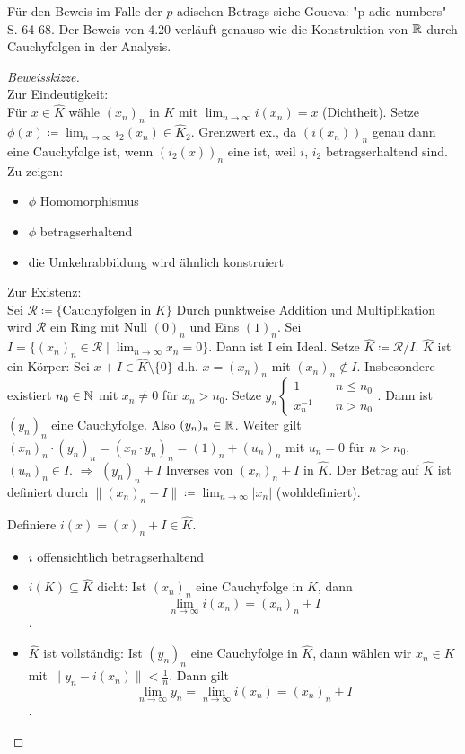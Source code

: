 \documentclass[../main.tex]{subfiles}
\begin{document}
Für den Beweis im Falle der $p$-adischen Betrags siehe Goueva: "p-adic numbers" S. 64-68.
Der Beweis von 4.20 verläuft genauso wie die Konstruktion von $\mathbb{R}$ durch Cauchyfolgen in der Analysis.
\begin{proof}[Beweisskizze]$ $\\
    Zur Eindeutigkeit:\\
    Für $x\in \hat{K}$ wähle $(x_n)_n$ in $K$ mit $\lim_{n\rightarrow \infty} i(x_n) = x$ (Dichtheit).
    Setze $\phi(x)\coloneqq \lim_{n\rightarrow\infty} i_2(x_n)\in \hat{K}_2$.
    Grenzwert ex., da $(i(x_n))_n$ genau dann eine Cauchyfolge ist, wenn $\left(i_2(x)\right)_n$ eine ist, weil $i$, $i_2$ betragserhaltend sind.
    Zu zeigen:
    \begin{itemize}[noitemsep]
        \item $\phi$ Homomorphismus
        \item $\phi$ betragserhaltend
        \item die Umkehrabbildung wird ähnlich konstruiert
    \end{itemize}

    \noindent
    Zur Existenz:\\
    Sei $\mathcal{R}\coloneqq \{\text{Cauchyfolgen in $K$}\}$
    Durch punktweise Addition und Multiplikation wird $\mathcal{R}$ ein Ring mit Null $(0)_n$ und Eins $(1)_n$.
    Sei $I = \{(x_n)_n\in \mathcal{R}\mid \lim_{n\rightarrow \infty} x_n = 0\}$.
    Dann ist I ein Ideal.
    Setze $\hat{K}\coloneqq \mathcal{R}/I$.
    $\hat{K}$ ist ein Körper: Sei $x+I\in \hat{K}\setminus \{0\}$ d.h.
    $x= (x_n)_n$ mit $(x_n)_n \notin I$.
    Insbesondere existiert $n_0\in\mathbb{N}$ mit $x_n\neq 0$ für $x_n>n_0$.
    Setze $y_n\begin{cases}
        1\quad&n\leq n_0\\
        x_n^{-1}\quad &n>n_0
    \end{cases}$.
    Dann ist $(y_n)_n$ eine Cauchyfolge.
    Also $(y_n)_n\in \mathbb{R}$.
    Weiter gilt $(x_n)_n\cdot(y_n)_n = (x_n\cdot y_n)_n = (1)_n + (u_n)_n$ mit $u_n =0$ für $n>n_0$, $(u_n)_n\in I$.
    $\Longrightarrow$ $(y_n)_n+I$ Inverses von $(x_n)_n+I$ in $\hat{K}$.
    Der Betrag auf $\hat{K}$ ist definiert durch $\|(x_n)_n+I\| \coloneqq \lim_{n\rightarrow \infty} |x_n|$ (wohldefiniert).

    Definiere $i(x) = (x)_n+I\in \hat{K}$.
    \begin{itemize}[noitemsep]
        \item $i$ offensichtlich betragserhaltend
        \item $i(K)\subseteq\hat{K}$ dicht: Ist $(x_n)_n$ eine Cauchyfolge in $K$, dann $$\lim_{n\rightarrow\infty} i(x_n) = (x_n)_n+I$$.
        \item $\hat{K}$ ist vollständig:
        Ist $(y_n)_n$ eine Cauchyfolge in $\hat{K}$, dann wählen wir $x_n\in K$ mit $\|y_n-i(x_n)\|<\frac{1}{n}$.
        Dann gilt $$\lim_{n\rightarrow\infty} y_n = \lim_{n\rightarrow\infty} i(x_n) = (x_n)_n +I$$.
    \end{itemize}
\end{proof}
\end{document}
